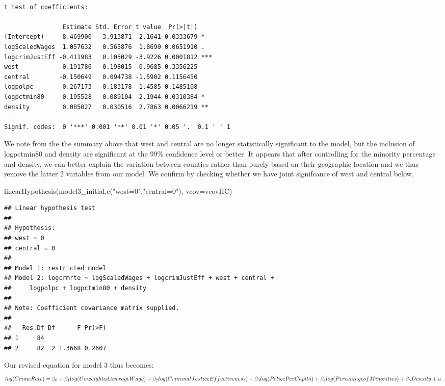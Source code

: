 \documentclass[]{article}
\newenvironment{Shaded}{}{}
\newcommand{\DataTypeTok}[1]{#1}
\newcommand{\KeywordTok}[1]{\textcolor[rgb]{0.00,0.00,1.00}{#1}}
\newcommand{\NormalTok}[1]{#1}
\newcommand{\StringTok}[1]{\textcolor[rgb]{0.00,0.50,0.50}{#1}}
\begin{document}
\begin{verbatim}

t test of coefficients:

                Estimate Std. Error t value  Pr(>|t|)    
(Intercept)    -8.469900   3.913871 -2.1641 0.0333679 *  
logScaledWages  1.057632   0.565876  1.8690 0.0651910 .  
logcrimJustEff -0.411983   0.105029 -3.9226 0.0001812 ***
west           -0.191786   0.198015 -0.9685 0.3356225    
central        -0.150649   0.094738 -1.5902 0.1156450    
logpolpc        0.267173   0.183178  1.4585 0.1485108    
logpctmin80     0.195528   0.089104  2.1944 0.0310384 *  
density         0.085027   0.030516  2.7863 0.0066219 ** 
---
Signif. codes:  0 '***' 0.001 '**' 0.01 '*' 0.05 '.' 0.1 ' ' 1
\end{verbatim}

We note from the the summary above that west and central are no longer
statistically significant to the model, but the inclusion of logpctmin80
and density are significant at the 99\% confidence level or better. It
appears that after controlling for the minority percentage and density,
we can better explain the variation between counties rather than purely
based on their geographic location and we thus remove the latter 2
variables from our model. We confirm by checking whether we have joint
signifcance of west and central below.

\begin{Shaded}
\begin{Highlighting}[]
\KeywordTok{linearHypothesis}\NormalTok{(model3_initial,}\KeywordTok{c}\NormalTok{(}\StringTok{"west=0"}\NormalTok{,}\StringTok{"central=0"}\NormalTok{), }\DataTypeTok{vcov=}\NormalTok{vcovHC)}
\end{Highlighting}
\end{Shaded}

\begin{verbatim}
## Linear hypothesis test
## 
## Hypothesis:
## west = 0
## central = 0
## 
## Model 1: restricted model
## Model 2: logcrmrte ~ logScaledWages + logcrimJustEff + west + central + 
##     logpolpc + logpctmin80 + density
## 
## Note: Coefficient covariance matrix supplied.
## 
##   Res.Df Df      F Pr(>F)
## 1     84                 
## 2     82  2 1.3668 0.2607
\end{verbatim}

Our revised equation for model 3 thus becomes:
\[log(CrimeRate) = \beta_0 + \beta_1log(UnweightedAverageWage) + \beta_2log(CriminalJusticeEffectiveness) +  \\ \beta_3log(PolicePerCapita) +\beta_4log(PercentageofMinorities) + \beta_5Density +u\]
\end{document}
